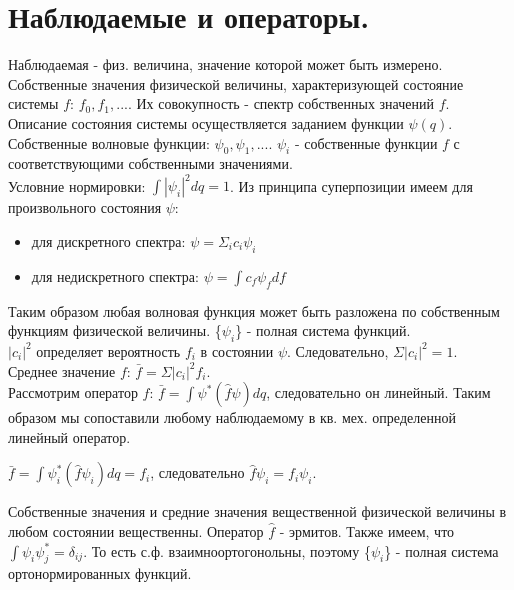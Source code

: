 \section {Наблюдаемые и операторы.}
Наблюдаемая - физ. величина, значение которой может быть измерено.
Собственные значения физической величины, характеризующей состояние системы $f$: $f_0, f_1, ...$. Их совокупность - спектр собственных значений $f$.
Описание состояния системы осуществляется заданием функции $\psi(q)$.
Собственные волновые функции: $\psi_0, \psi_1, ...$. $\psi_i$ - собственные функции $f$ с соответствующими собственными значениями.\\
Условние нормировки: $\int |\psi_i|^2dq = 1$. Из принципа суперпозиции имеем для произвольного состояния $\psi$:
\begin{itemize}
\item для дискретного спектра:  $\psi = \Sigma_i c_i\psi_i$
\item для недискретного спектра: $\psi = \int c_f\psi_fdf$
\end{itemize}
Таким образом любая волновая функция может быть разложена по собственным функциям физической величины. \{$\psi_i$\} - полная система функций.\\
$|c_i|^2$ определяет вероятность $f_i$ в состоянии $\psi$. Следовательно, $\Sigma |c_i|^2 = 1$.\\
Среднее значение $f$: $\bar{f} = \Sigma |c_i|^2f_i$.\\
Рассмотрим оператор $\hat{f}$: $\bar{f} = \int \psi^*(\hat{f}\psi)dq$, следовательно он линейный. Таким образом мы сопоставили любому наблюдаемому в кв. мех. определенной линейный оператор.
\begin{center}
$\bar{f} = \int \psi_i^*(\hat{f}\psi_i)dq = f_i$, следовательно $\hat{f}\psi_i = f_i\psi_i$.
\end{center}
Собственные значения и средние значения вещественной физической величины в любом состоянии вещественны. Оператор $\hat{f}$ - эрмитов. Также имеем, что $\int \psi_i \psi_j^* = \delta_{ij}$. То есть с.ф. взаимноортогонольны, поэтому \{$\psi_i$\} - полная система ортонормированных функций.\\
